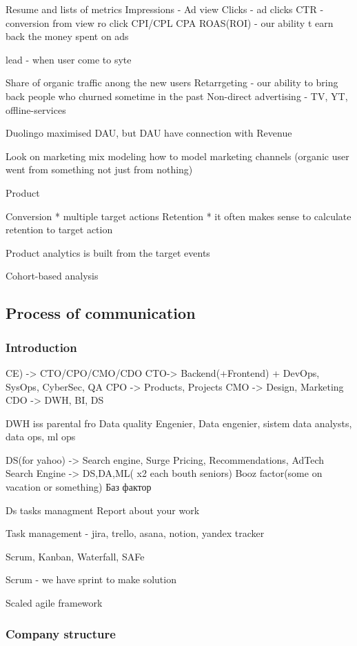 \documentclass[12pt, a4paper, oneside]{article}
\begin{document}
Resume and lists of metrics
Impressions - Ad view
Clicks - ad clicks
CTR - conversion from view ro click
CPI/CPL
CPA
ROAS(ROI) - our ability t earn back the money spent on ads

lead - when user come to syte

Share of organic traffic anong the new users
Retarrgeting - our ability to bring back people who churned sometime in the past
Non-direct advertising - TV, YT, offline-services 


Duolingo maximised DAU, but DAU have connection with Revenue 

Look on marketing mix modeling how to model marketing channels 
(organic user went from something not just from nothing)


Product 

Conversion
* multiple target actions
Retention
* it often makes sense to calculate retention to target action 

Product analytics is built from the target events

Cohort-based analysis

\subsection{Process of communication }

\subsubsection{Introduction}
CE) -> CTO/CPO/CMO/CDO
CTO-> Backend(+Frontend) + DevOps, SysOps, CyberSec, QA
CPO -> Products, Projects
CMO -> Design, Marketing
CDO -> DWH, BI, DS 

DWH iss parental fro Data quality Engenier, Data engenier, sistem data analysts, data ops, ml ops 

DS(for yahoo) -> Search engine, Surge Pricing, Recommendations, AdTech 
Search Engine -> DS,DA,ML( x2 each bouth seniors) 
Booz factor(some on vacation or something)
Баз фактор 

Ds tasks managment
Report about your work 

Task management - jira, trello, asana, notion, yandex tracker 

Scrum, Kanban, Waterfall, SAFe 

Scrum - we have sprint to make solution 

Scaled agile framework 

\subsubsection{Company structure}
\end{document}
